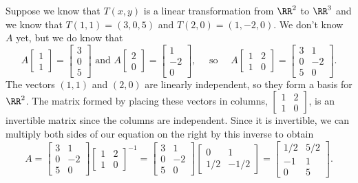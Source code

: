 \begin{example}
Suppose we know that $T(x,y)$ is a linear transformation from $\RR^2$ to $\RR^3$ and we know that $T(1,1)=(3,0,5)$ and $T(2,0)=(1,-2,0)$. We don't know $A$ yet, but we do know that 
$$
A\begin{bmatrix}1\\1\end{bmatrix} = \begin{bmatrix}3\\0\\5\end{bmatrix} \text{ and }
A\begin{bmatrix}2\\0\end{bmatrix} = \begin{bmatrix}1\\-2\\0\end{bmatrix},\quad \text{ so  } \quad
A\begin{bmatrix}1&2\\1&0\end{bmatrix} = \begin{bmatrix}3&1\\0&-2\\5&0\end{bmatrix}.
$$  
The vectors $(1,1)$ and $(2,0)$ are linearly independent, so they form a basis for $\RR^2$. The matrix formed by placing these vectors in columns, $\begin{bmatrix}1&2\\1&0\end{bmatrix}$, is an invertible matrix since the columns are independent. Since it is invertible, we can multiply both sides of our equation on the right by this inverse to obtain $$A= \begin{bmatrix}3&1\\0&-2\\5&0\end{bmatrix}\begin{bmatrix}1&2\\1&0\end{bmatrix}^{-1} = \begin{bmatrix}3&1\\0&-2\\5&0\end{bmatrix}\begin{bmatrix}0&1\\1/2&-1/2\end{bmatrix} =\begin{bmatrix}1/2&5/2\\-1&1\\0&5\end{bmatrix}.$$ 

\end{example}
